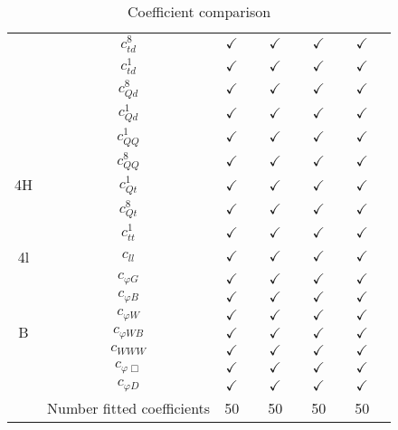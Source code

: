 \documentclass{article}
\begin{document}
\begin{table}[H]
\begin{tabular}{|c|c|c|c|c|c|c|c|c|c|}
 & $c_{td}^{8}$ & $\checkmark$ &  & $\checkmark$ &  & $\checkmark$ &  & $\checkmark$ & \\ \cline{2-10}
 & $c_{td}^{1}$ & $\checkmark$ &  & $\checkmark$ &  & $\checkmark$ &  & $\checkmark$ & \\ \cline{2-10}
 & $c_{Qd}^{8}$ & $\checkmark$ &  & $\checkmark$ &  & $\checkmark$ &  & $\checkmark$ & \\ \cline{2-10}
 & $c_{Qd}^{1}$ & $\checkmark$ &  & $\checkmark$ &  & $\checkmark$ &  & $\checkmark$ &
\\ \hline
\multirow{5}{*}{4H}
 & $c_{QQ}^{1}$ & $\checkmark$ &  & $\checkmark$ &  & $\checkmark$ &  & $\checkmark$ & \\ \cline{2-10}
 & $c_{QQ}^{8}$ & $\checkmark$ &  & $\checkmark$ &  & $\checkmark$ &  & $\checkmark$ & \\ \cline{2-10}
 & $c_{Qt}^{1}$ & $\checkmark$ &  & $\checkmark$ &  & $\checkmark$ &  & $\checkmark$ & \\ \cline{2-10}
 & $c_{Qt}^{8}$ & $\checkmark$ &  & $\checkmark$ &  & $\checkmark$ &  & $\checkmark$ & \\ \cline{2-10}
 & $c_{tt}^{1}$ & $\checkmark$ &  & $\checkmark$ &  & $\checkmark$ &  & $\checkmark$ &
\\ \hline
\multirow{1}{*}{4l}
 & $c_{ll}$ & $\checkmark$ &  & $\checkmark$ &  & $\checkmark$ &  & $\checkmark$ &
\\ \hline
\multirow{7}{*}{B}
 & $c_{\varphi G}$ & $\checkmark$ &  & $\checkmark$ &  & $\checkmark$ &  & $\checkmark$ & \\ \cline{2-10}
 & $c_{\varphi B}$ & $\checkmark$ &  & $\checkmark$ &  & $\checkmark$ &  & $\checkmark$ & \\ \cline{2-10}
 & $c_{\varphi W}$ & $\checkmark$ &  & $\checkmark$ &  & $\checkmark$ &  & $\checkmark$ & \\ \cline{2-10}
 & $c_{\varphi WB}$ & $\checkmark$ &  & $\checkmark$ &  & $\checkmark$ &  & $\checkmark$ & \\ \cline{2-10}
 & $c_{WWW}$ & $\checkmark$ &  & $\checkmark$ &  & $\checkmark$ &  & $\checkmark$ & \\ \cline{2-10}
 & $c_{\varphi \Box}$ & $\checkmark$ &  & $\checkmark$ &  & $\checkmark$ &  & $\checkmark$ & \\ \cline{2-10}
 & $c_{\varphi D}$ & $\checkmark$ &  & $\checkmark$ &  & $\checkmark$ &  & $\checkmark$ &
\\ \hline
\hline & Number fitted coefficients & 50 &  & 50 &  & 50 &  & 50 &  \\ \hline
\end{tabular}
\caption{Coefficient comparison}
\end{table}
\end{document}
